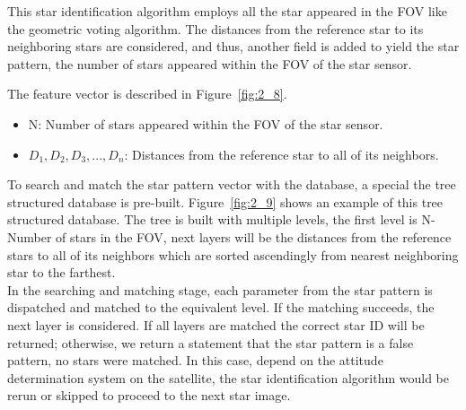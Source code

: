 \noindent This star identification algorithm employs all the star appeared in the FOV like the geometric voting algorithm. The distances from the reference star to its neighboring stars are considered, and thus, another field is added to yield the star pattern, the number of stars appeared within the FOV of the star sensor. \\


\noindent The feature vector is described in Figure~\ref{fig:2_8}.
\begin{center}
	\begin{itemize}
		\item N: Number of stars appeared within the FOV of the star sensor.
		\item $D_1, D_2, D_3, ..., D_n$: Distances from the reference star to all of its neighbors.
	\end{itemize}
\end{center}

\noindent To search and match the star pattern vector with the database, a special the tree structured database is pre-built. Figure~\ref{fig:2_9} shows an example of this tree structured database. The tree is built with multiple levels, the first level is N-Number of stars in the FOV, next layers will be the distances from the reference stars to all of its neighbors which are sorted ascendingly from nearest neighboring star to the farthest. \\

\noindent In the searching and matching stage, each parameter from the star pattern is dispatched and matched to the equivalent level. If the matching succeeds, the next layer is considered. If all layers are matched the correct star ID will be returned; otherwise, we return a statement that the star pattern is a false pattern, no stars were matched. In this case, depend on the attitude determination system on the satellite, the star identification algorithm would be rerun or skipped to proceed to the next star image.

